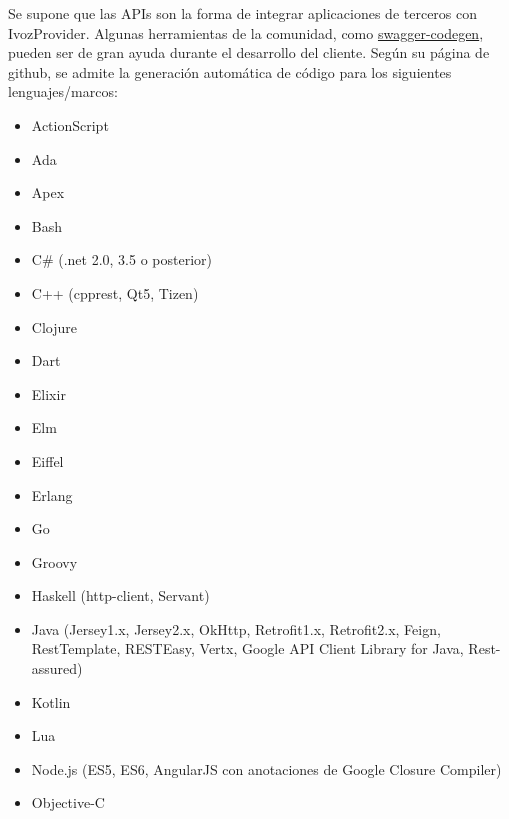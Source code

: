 \documentclass[letterpaper,10pt,spanish]{sphinxmanual}
\begin{document}
Se supone que las APIs son la forma de integrar aplicaciones de terceros con IvozProvider. Algunas herramientas de la comunidad, como \href{https://github.com/swagger-api/swagger-codegen}{swagger-codegen}, pueden ser de gran ayuda durante el desarrollo del cliente. Según su página de github, se admite la generación automática de código para los siguientes lenguajes/marcos:
\begin{itemize}
\item {} 
ActionScript

\item {} 
Ada

\item {} 
Apex

\item {} 
Bash

\item {} 
C\# (.net 2.0, 3.5 o posterior)

\item {} 
C++ (cpprest, Qt5, Tizen)

\item {} 
Clojure

\item {} 
Dart

\item {} 
Elixir

\item {} 
Elm

\item {} 
Eiffel

\item {} 
Erlang

\item {} 
Go

\item {} 
Groovy

\item {} 
Haskell (http-client, Servant)

\item {} 
Java (Jersey1.x, Jersey2.x, OkHttp, Retrofit1.x, Retrofit2.x, Feign, RestTemplate, RESTEasy, Vertx, Google API Client Library for Java, Rest-assured)

\item {} 
Kotlin

\item {} 
Lua

\item {} 
Node.js (ES5, ES6, AngularJS con anotaciones de Google Closure Compiler)

\item {} 
Objective-C


\end{itemize}
\end{document}
